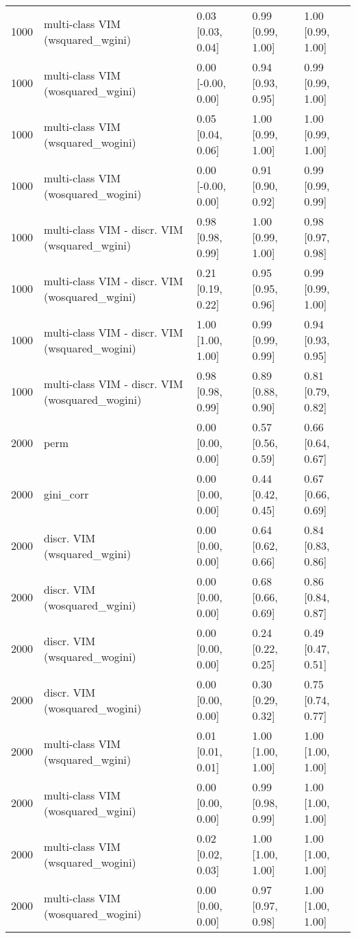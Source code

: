 \begin{table}[ht]
\begin{tabular}{rllll}
  1000 & multi-class VIM (wsquared\_wgini) & 0.03 [0.03, 0.04] & 0.99 [0.99, 1.00] & 1.00 [0.99, 1.00] \\ 
  1000 & multi-class VIM (wosquared\_wgini) & 0.00 [-0.00, 0.00] & 0.94 [0.93, 0.95] & 0.99 [0.99, 1.00] \\ 
  1000 & multi-class VIM (wsquared\_wogini) & 0.05 [0.04, 0.06] & 1.00 [0.99, 1.00] & 1.00 [0.99, 1.00] \\ 
  1000 & multi-class VIM (wosquared\_wogini) & 0.00 [-0.00, 0.00] & 0.91 [0.90, 0.92] & 0.99 [0.99, 0.99] \\ 
  1000 & multi-class VIM - discr. VIM (wsquared\_wgini) & 0.98 [0.98, 0.99] & 1.00 [0.99, 1.00] & 0.98 [0.97, 0.98] \\ 
  1000 & multi-class VIM - discr. VIM (wosquared\_wgini) & 0.21 [0.19, 0.22] & 0.95 [0.95, 0.96] & 0.99 [0.99, 1.00] \\ 
  1000 & multi-class VIM - discr. VIM (wsquared\_wogini) & 1.00 [1.00, 1.00] & 0.99 [0.99, 0.99] & 0.94 [0.93, 0.95] \\ 
  1000 & multi-class VIM - discr. VIM (wosquared\_wogini) & 0.98 [0.98, 0.99] & 0.89 [0.88, 0.90] & 0.81 [0.79, 0.82] \\ 
   \hline 2000 & perm & 0.00 [0.00, 0.00] & 0.57 [0.56, 0.59] & 0.66 [0.64, 0.67] \\ 
  2000 & gini\_corr & 0.00 [0.00, 0.00] & 0.44 [0.42, 0.45] & 0.67 [0.66, 0.69] \\ 
  2000 & discr. VIM (wsquared\_wgini) & 0.00 [0.00, 0.00] & 0.64 [0.62, 0.66] & 0.84 [0.83, 0.86] \\ 
  2000 & discr. VIM (wosquared\_wgini) & 0.00 [0.00, 0.00] & 0.68 [0.66, 0.69] & 0.86 [0.84, 0.87] \\ 
  2000 & discr. VIM (wsquared\_wogini) & 0.00 [0.00, 0.00] & 0.24 [0.22, 0.25] & 0.49 [0.47, 0.51] \\ 
  2000 & discr. VIM (wosquared\_wogini) & 0.00 [0.00, 0.00] & 0.30 [0.29, 0.32] & 0.75 [0.74, 0.77] \\ 
  2000 & multi-class VIM (wsquared\_wgini) & 0.01 [0.01, 0.01] & 1.00 [1.00, 1.00] & 1.00 [1.00, 1.00] \\ 
  2000 & multi-class VIM (wosquared\_wgini) & 0.00 [0.00, 0.00] & 0.99 [0.98, 0.99] & 1.00 [1.00, 1.00] \\ 
  2000 & multi-class VIM (wsquared\_wogini) & 0.02 [0.02, 0.03] & 1.00 [1.00, 1.00] & 1.00 [1.00, 1.00] \\ 
  2000 & multi-class VIM (wosquared\_wogini) & 0.00 [0.00, 0.00] & 0.97 [0.97, 0.98] & 1.00 [1.00, 1.00] \\ 

\end{tabular}
\end{table}
